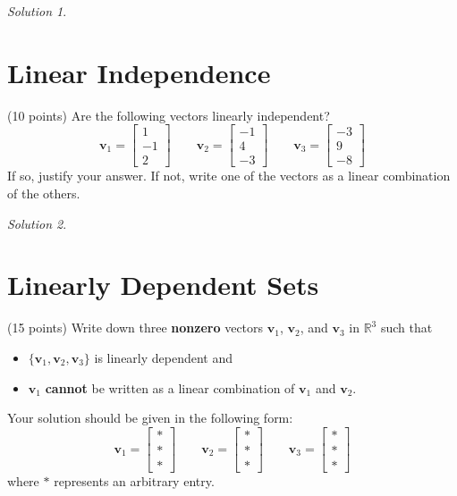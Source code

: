 \documentclass{article}
\theoremstyle{remark}
\newtheorem*{solution}{Solution}
\begin{document}
\begin{solution}
\end{solution}

\pagebreak
\section{Linear Independence}

(10 points) Are the following vectors linearly independent?
\begin{displaymath}
  \mathbf v_1 = \begin{bmatrix}
    1 \\ -1 \\ 2
  \end{bmatrix}
  \qquad
  \mathbf v_2 =
  \begin{bmatrix}
    -1 \\ 4 \\ -3
  \end{bmatrix}
  \qquad
  \mathbf v_3 =
  \begin{bmatrix}
    -3 \\ 9 \\ -8
  \end{bmatrix}
\end{displaymath}
If so, justify your answer. If not, write one of the vectors as a linear combination of the others.
\begin{solution}
\end{solution}

\pagebreak
\section{Linearly Dependent Sets}
(15 points) Write down three \textbf{nonzero} vectors $\mathbf v_1$, $\mathbf v_2$, and $\mathbf v_3$ in $\mathbb R^3$ such that
\begin{itemize}
\item $\{\mathbf v_1, \mathbf v_2, \mathbf v_3\}$ is linearly dependent and
\item $\mathbf v_1$ \textbf{cannot} be written as a linear combination of $\mathbf v_1$ and $\mathbf v_2$.
\end{itemize}
Your solution should be given in the following form:
\begin{displaymath}
  \mathbf v_1 =
  \begin{bmatrix}
    * \\ * \\ *
  \end{bmatrix}
  \qquad
  \mathbf v_2 =
  \begin{bmatrix}
    * \\ * \\ *
  \end{bmatrix}
  \qquad
  \mathbf v_3 =
  \begin{bmatrix}
    * \\ * \\ *
  \end{bmatrix}
\end{displaymath}
where $*$ represents an arbitrary entry.
\end{document}
